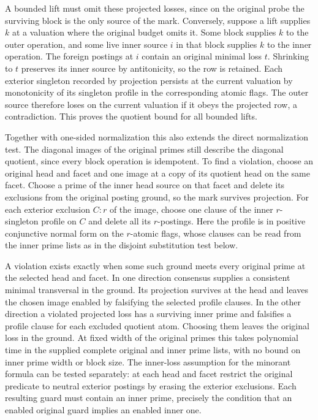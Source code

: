 A bounded lift must omit these projected losses,
since on the original probe the surviving block is
the only source of the mark. Conversely, suppose a
lift supplies $k$ at a valuation where the original
budget omits it. Some block supplies $k$ to the outer
operation, and some live inner source $i$ in that
block supplies $k$ to the inner operation. The
foreign postings at $i$ contain an original minimal
loss $t$. Shrinking to $t$ preserves its inner
source by antitonicity, so the row is retained.
Each exterior singleton recorded by projection
persists at the current valuation by monotonicity
of its singleton profile in the corresponding
atomic flags. The outer source therefore loses
on the current valuation if it obeys the projected
row, a contradiction. This proves the quotient
bound for all bounded lifts.

Together with one-sided normalization this also
extends the direct normalization test. The diagonal
images of the original primes still describe the
diagonal quotient, since every block operation is
idempotent. To find a violation, choose an original
head and facet and one image at a copy of its
quotient head on the same facet. Choose a prime
of the inner head source on that facet and delete
its exclusions from the original posting ground,
so the mark survives projection. For each exterior
exclusion $C:r$ of the image, choose one clause of
the inner $r$-singleton profile on $C$ and delete
all its $r$-postings. Here the profile is in positive
conjunctive normal form on the $r$-atomic flags,
whose clauses can be read from the inner prime
lists as in the disjoint substitution test below.

A violation exists exactly when some such ground
meets every original prime at the selected head
and facet. In one direction consensus supplies a
consistent minimal transversal in the ground.
Its projection survives at the head and leaves the
chosen image enabled by falsifying the selected
profile clauses. In the other direction a violated
projected loss has a surviving inner prime and
falsifies a profile clause for each excluded quotient
atom. Choosing them leaves the original loss in
the ground. At fixed width of the original primes
this takes polynomial time in the supplied complete
original and inner prime lists, with no bound on
inner prime width or block size. The inner-loss
assumption for the minorant formula can be tested
separately: at each head and facet restrict the
original predicate to neutral exterior postings by
erasing the exterior exclusions. Each resulting
guard must contain an inner prime, precisely the
condition that an enabled original guard implies
an enabled inner one.

